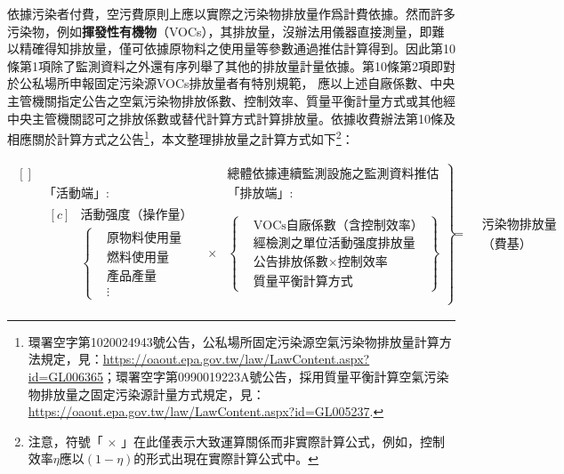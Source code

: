 依據污染者付費，空污費原則上應以實際之污染物排放量作爲計費依據。然而許多污染物，例如\textbf{揮發性有機物}（VOCs），其排放量，沒辦法用儀器直接測量，即難以精確得知排放量，僅可依據原物料之使用量等參數通過推估計算得到。因此第10條第1項除了監測資料之外還有序列舉了其他的排放量計量依據。第10條第2項即對於公私場所申報固定污染源VOCs排放量者有特別規範，
應以上述自廠係數、中央主管機關指定公告之空氣污染物排放係數、控制效率、質量平衡計量方式或其他經中央主管機關認可之排放係數或替代計算方式計算排放量。依據收費辦法第10條及相應關於計算方式之公告\footnote{環署空字第1020024943號公告，公私場所固定污染源空氣污染物排放量計算方法規定，見：\url{https://oaout.epa.gov.tw/law/LawContent.aspx?id=GL006365}；環署空字第0990019223A號公告，採用質量平衡計算空氣污染物排放量之固定污染源計量方式規定，見：\url{https://oaout.epa.gov.tw/law/LawContent.aspx?id=GL005237}.}，本文整理排放量之計算方式如下\footnote{注意，符號「 $\times$ 」在此僅表示大致運算關係而非實際計算公式，例如，控制效率\(\eta\)應以\((1-\eta)\)的形式出現在實際計算公式中。}：




\begin{equation*}
  \begin{aligned}
    \left.\!\begin{aligned}[]
    &&& \text{總體依據連續監測設施之監測資料推估}\\[3ex]
    &\textbf{「活動端」:}& &\textbf{「排放端」:} \\
    &\!\begin{aligned}[c]
    &\text{活動强度（操作量）} \\
    &\left\{\begin{aligned}
      &\text{原物料使用量} \\
      &\text{燃料使用量} \\
      &\text{產品產量} \\
      &\vdots
    \end{aligned}
      \right.
    \end{aligned}
  &\times& \left\{\!\begin{aligned}
    &\text{VOCs自廠係數（含控制效率）}\\[1ex]
    &\text{經檢測之單位活動强度排放量}\\[1ex]
      &\text{公告排放係數}\times \text{控制效率}\\[1ex]
      &\text{質量平衡計算方式}
      \end{aligned}\right\}\end{aligned}\right\}=
      \begin{aligned}
        &\text{污染物排放量}\\
        &\text{（費基）}
      \end{aligned}
  \end{aligned}
\end{equation*}

